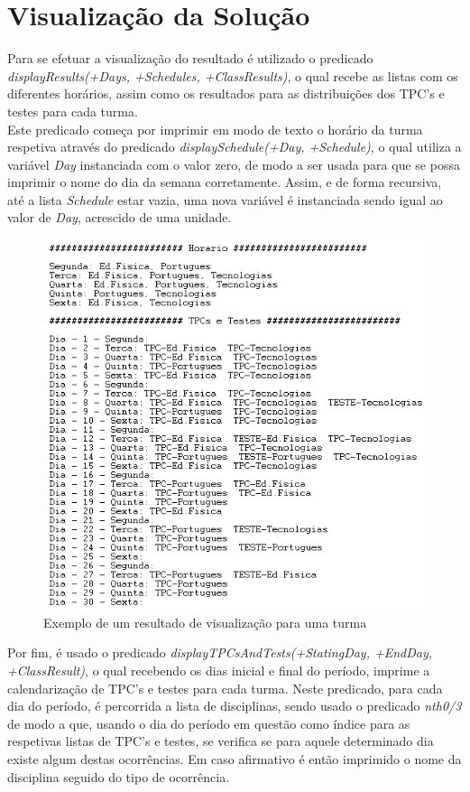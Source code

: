 \documentclass{llncs}
\begin{document}
\section{Visualização da Solução}
Para se efetuar a visualização do resultado é utilizado o predicado \textit{displayResults(+Days, +Schedules, +ClassResults)}, o qual recebe as listas com os diferentes horários, assim como os resultados para as distribuições dos TPC's e testes para cada turma.\\
Este predicado começa por imprimir em modo de texto o horário da turma respetiva através do predicado \textit{displaySchedule(+Day, +Schedule)}, o qual utiliza a variável \textit{Day} instanciada com o valor zero, de modo a ser usada para que se possa imprimir o nome do dia da semana corretamente. Assim, e de forma recursiva, até a lista \textit{Schedule} estar vazia, uma nova variável é instanciada sendo igual ao  valor de \textit{Day}, acrescido de uma unidade.\\

\begin{figure}
\centering
\includegraphics[scale=0.8]{display.png}
\caption{Exemplo de um resultado de visualização para uma turma}
\end{figure}

Por fim, é usado o predicado \textit{displayTPCsAndTests(+StatingDay, +EndDay, +ClassResult)}, o qual recebendo os dias inicial e final do período, imprime a calendarização de TPC's e testes para cada turma. Neste predicado, para cada dia do período, é percorrida a lista de disciplinas, sendo usado o predicado \textit{nth0/3} de modo a que, usando o dia do período em questão como índice para as respetivas listas de TPC's e testes, se verifica se para aquele determinado dia existe algum destas ocorrências. Em caso afirmativo é então imprimido o nome da disciplina seguido do tipo de ocorrência.
\end{document}
